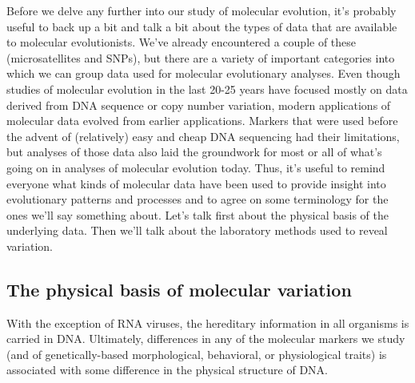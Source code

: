 Before we delve any further into our study of molecular evolution,
it's probably useful to back up a bit and talk a bit about the types
of data that are available to molecular evolutionists. We've already
encountered a couple of these (microsatellites and SNPs), but there
are a variety of important categories into which we can group data
used for molecular evolutionary analyses. Even though studies of
molecular evolution in the last 20-25 years have focused mostly on
data derived from DNA sequence or copy number variation, modern
applications of molecular data evolved from earlier
applications. Markers that were used before the advent of (relatively)
easy and cheap DNA sequencing had their limitations, but analyses of
those data also laid the groundwork for most or all of what's going on
in analyses of molecular evolution today. Thus, it's useful to remind
everyone what kinds of molecular data have been used to provide
insight into evolutionary patterns and processes and to agree on some
terminology for the ones we'll say something about. Let's talk first
about the physical basis of the underlying data. Then we'll talk about
the laboratory methods used to reveal variation.

\subsection*{The physical basis of molecular variation}

With the exception of RNA viruses, the hereditary information in all
organisms is carried in DNA. Ultimately, differences in any of the
molecular markers we study (and of genetically-based morphological,
behavioral, or physiological traits) is associated with some
difference in the physical structure of DNA.


